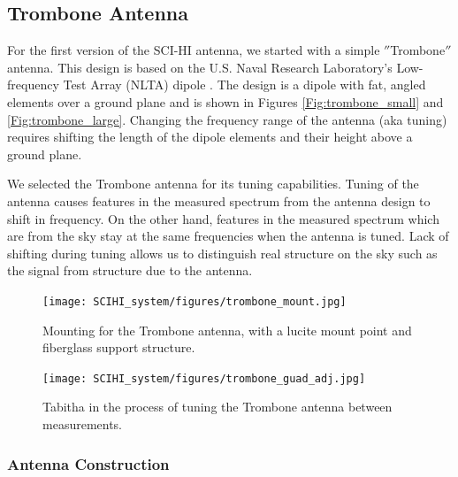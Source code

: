 \subsection{Trombone Antenna}

For the first version of the SCI-HI antenna, we started with a simple $''$Trombone$''$ antenna. This design is based on the U.S. Naval Research Laboratory's Low-frequency Test Array (NLTA) dipole \cite{ellingson_2005}. The design is a dipole with fat, angled elements over a ground plane and is shown in Figures \ref{Fig:trombone_small} and \ref{Fig:trombone_large}. Changing the frequency range of the antenna (aka tuning) requires shifting the length of the dipole elements and their height above a ground plane. 

We selected the Trombone antenna for its tuning capabilities. Tuning of the antenna causes features in the measured spectrum from the antenna design to shift in frequency. On the other hand, features in the measured spectrum which are from the sky stay at the same frequencies when the antenna is tuned. Lack of shifting during tuning allows us to distinguish real structure on the sky such as the \cm signal from structure due to the antenna. 

\begin{figure}[htb]
\centering
\begin{minipage}[b]{0.53\textwidth}
\centering
\texttt{[image: SCIHI\_system/figures/trombone\_mount.jpg]}
\caption{Mounting for the Trombone antenna, with a lucite mount point and fiberglass support structure. }
\label{Fig:trombone_mount}
\end{minipage}%
\begin{minipage}[b]{0.02\textwidth}
\hspace{1cm}
\end{minipage}%
\begin{minipage}[b]{0.41\textwidth}
\centering
\texttt{[image: SCIHI\_system/figures/trombone\_guad\_adj.jpg]}
\caption{Tabitha in the process of tuning the Trombone antenna between measurements.}
\label{Fig:trombone_adj}
\end{minipage}
\end{figure}

\subsubsection{Antenna Construction}

